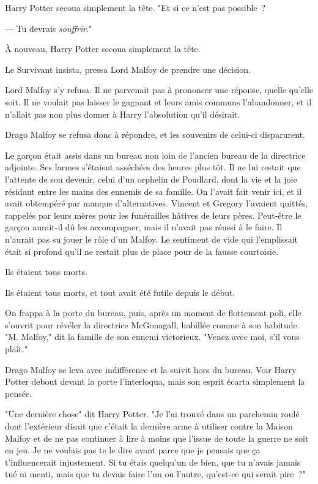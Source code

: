 Harry Potter secoua simplement la tête. "Et si ce n'est pas possible~?

--- Tu devrais \emph{souffrir}."

À nouveau, Harry Potter secoua simplement la tête.

Le Survivant insista, pressa Lord Malfoy de prendre une décision.

Lord Malfoy s'y refusa. Il ne parvenait pas à prononcer une réponse, quelle qu'elle soit. Il ne voulait pas laisser le gagnant et leurs amis communs l'abandonner, et il n'allait pas non plus donner à Harry l'absolution qu'il désirait.

Drago Malfoy se refusa donc à répondre, et les souvenirs de celui-ci disparurent.

\later

Le garçon était assis dans un bureau non loin de l'ancien bureau de la directrice adjointe. Ses larmes s'étaient asséchées des heures plus tôt. Il ne lui restait que l'attente de son devenir, celui d'un orphelin de Poudlard, dont la vie et la joie résidant entre les mains des ennemis de sa famille. On l'avait fait venir ici, et il avait obtempéré par manque d'alternatives. Vincent et Gregory l'avaient quittés, rappelés par leurs mères pour les funérailles hâtives de leurs pères. Peut-être le garçon aurait-il dû les accompagner, mais il n'avait pas réussi à le faire. Il n'aurait pas su jouer le rôle d'un Malfoy. Le sentiment de vide qui l'emplissait était si profond qu'il ne restait plus de place pour de la fausse courtoisie.

Ils étaient tous morts.

Ils étaient tous morts, et tout avait été futile depuis le début.

On frappa à la porte du bureau, puis, après un moment de flottement poli, elle s'ouvrit pour révéler la directrice McGonagall, habillée comme à son habitude. "M. Malfoy," dit la famille de son ennemi victorieux. "Venez avec moi, s'il vous plaît."

Drago Malfoy se leva avec indifférence et la suivit hors du bureau. Voir Harry Potter debout devant la porte l'interloqua, mais son esprit écarta simplement la pensée.

"Une dernière chose" dit Harry Potter. "Je l'ai trouvé dans un parchemin roulé dont l'extérieur disait que c'était la dernière arme à utiliser contre la Maison Malfoy et de ne pas continuer à lire à moins que l'issue de toute la guerre ne soit en jeu. Je ne voulais pas te le dire avant parce que je pensais que ça t'influencerait injustement. Si tu étais quelqu'un de bien, que tu n'avais jamais tué ni menti, mais que tu devais faire l'un ou l'autre, qu'est-ce qui serait pire~?"

